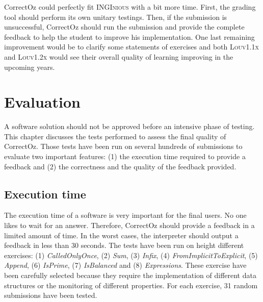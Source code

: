 \documentclass[11pt,a4paper,twoside,openright]{report}
\begin{document}
CorrectOz could perfectly fit \textsc{INGInious} with a bit more time. 
First, the grading tool should perform its own unitary testings. Then, if the 
submission is unsuccessful, CorrectOz should run the submission and 
provide the complete feedback to help the student to improve his implementation. 
One last remaining improvement would be to clarify some statements of exercises 
and both \textsc{Louv1.1x} and \textsc{Louv1.2x} would see their overall quality 
of learning improving in the upcoming years.



\chapter{Evaluation} \label{chap:evaluation}
A software solution should not be approved before an intensive phase of 
testing. This chapter discusses the tests performed to assess the final quality 
of CorrectOz. Those tests have been run on several hundreds of submissions 
to evaluate two important features: (1) the execution time required to provide 
a feedback and (2) the correctness and the quality of the feedback provided.


\section{Execution time}
The execution time of a software is very important for the final users. No one 
likes to wait for an answer. Therefore, CorrectOz should provide a feedback in a 
limited amount of time. In the worst cases, the interpreter should output a 
feedback in less than 30 seconds. The tests have been run on height 
different exercises: (1) \textit{CalledOnlyOnce}, (2) \textit{Sum}, (3) 
\textit{Infix}, (4) \textit{FromImplicitToExplicit}, (5) \textit{Append}, (6) 
\textit{IsPrime}, (7) \textit{IsBalanced} and (8) \textit{Expressions}. These 
exercise have been carefully selected because they require the implementation of
different data structures or the monitoring of different properties. For each 
exercise, 31 random submissions have been tested.\\
\end{document}
